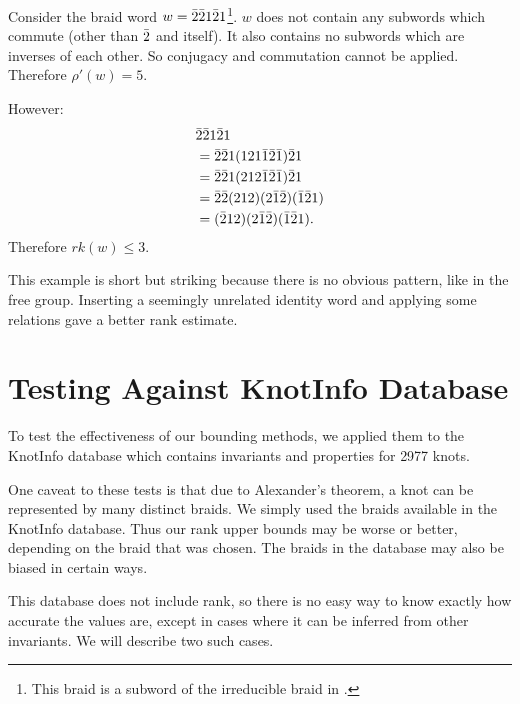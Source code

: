 \documentclass[12pt]{thesis}
\begin{document}
\begin{example}
    \label{ex:does-not-solve}
    Consider the braid word $w = \bar{2} \bar{2} 1 \bar{2} 1$\footnote{This braid is a subword of the irreducible braid in \cite{irreducible-braid}.}.
    $w$ does not contain any subwords which commute
    (other than $\bar{2}$ and itself).
    It also contains no subwords which are inverses of each other.
    So conjugacy and commutation cannot be applied.
    Therefore $\rho'(w) = 5$.

    However:
    \[
        \begin{split}
            &\bar{2} \bar{2} 1 \bar{2} 1 \\
            &=\bar{2} \bar{2} 1 (1 2 1 \bar{1} \bar{2} \bar{1}) \bar{2} 1  \\
            &=\bar{2} \bar{2} 1 (2 1 2 \bar{1} \bar{2} \bar{1}) \bar{2} 1  \\
            &=\bar{2} \bar{2} (2 1 2) (2 \bar{1} \bar{2}) (\bar{1} \bar{2} 1)  \\
            &= (\bar{2} 1 2) (2 \bar{1} \bar{2}) (\bar{1} \bar{2} 1).  \\
        \end{split}
    \]  
    Therefore $rk(w) \leq 3$.
\end{example}

This example is short but striking because
there is no obvious pattern, like in the free group.
Inserting a seemingly unrelated identity word
and applying some relations gave a better rank estimate.

\section{Testing Against KnotInfo Database}
\begin{sloppypar}
To test the effectiveness of our bounding methods,
we applied them to the KnotInfo database \cite{knotinfo} which contains invariants and properties for 2977 knots.
\end{sloppypar}

One caveat to these tests is that due
to Alexander's theorem, a knot can be represented by many distinct braids.
We simply used the braids available in the KnotInfo database.
Thus our rank upper bounds may be worse or better, depending on the braid that was chosen.
The braids in the database may also be biased in certain ways.

This database does not include rank,
so there is no easy way to know exactly how accurate the values are,
except in cases where it can be inferred from other invariants.
We will describe two such cases.
\end{document}
